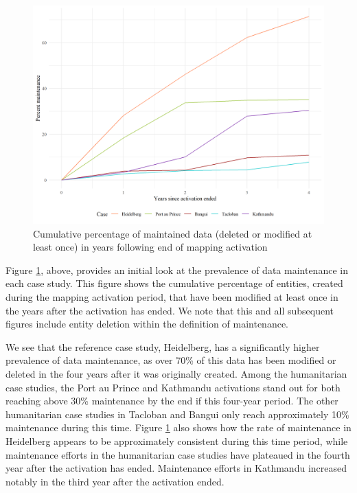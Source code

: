 \begin{figure} %
    \centering %
    \includegraphics[width = \textwidth]{Images/totmaint.png} %
    \caption{Cumulative percentage of maintained data (deleted or modified at least once) in years following end of mapping activation} %
    \label{fig:tot} %
\end{figure}

Figure \ref{fig:tot}, above, provides an initial look at the prevalence of data maintenance in each case study. This figure shows the cumulative percentage of entities, created during the mapping activation period, that have been modified at least once in the years after the activation has ended. We note that this and all subsequent figures include entity deletion within the definition of maintenance. 

We see that the reference case study, Heidelberg, has a significantly higher prevalence of data maintenance, as over 70\% of this data has been modified or deleted in the four years after it was originally created. Among the humanitarian case studies, the Port au Prince and Kathmandu activations stand out for both reaching above 30\% maintenance by the end if this four-year period. The other humanitarian case studies in Tacloban and Bangui only reach approximately 10\% maintenance during this time. Figure \ref{fig:tot} also shows how the rate of maintenance in Heidelberg appears to be approximately consistent during this time period, while maintenance efforts in the humanitarian case studies have plateaued in the fourth year after the activation has ended. Maintenance efforts in Kathmandu increased notably in the third year after the activation ended.

